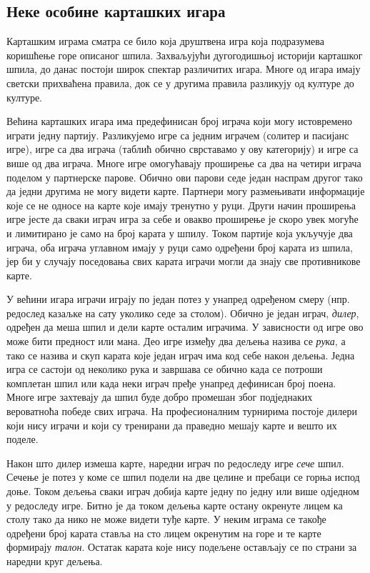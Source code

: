 \documentclass[a4paper, 12pt, ngerman]{article}
\let\oldsubsection\subsection
\renewcommand\subsection{\clearpage\oldsubsection}
\begin{document}
\subsection{Неке особине карташких игара}
Карташким играма сматра се било која друштвена игра која подразумева коришћење горе описаног шпила. Захваљујући дугогодишњој историји карташког шпила, до данас постоји широк спектар различитих игара. Многе од игара имају светски прихваћена правила, док се у другима правила разликују од културе до културе.

Већина карташких игара има предефинисан број играча који могу истовремено играти једну партију. Разликујемо игре са једним играчем (солитер и пасијанс игре), игре са два играча (таблић обично сврставамо у ову категорију) и игре са више од два играча. Многе игре омогућавају проширење са два на четири играча поделом у партнерске парове. Обично ови парови седе један наспрам другог тако да једни другима не могу видети карте. Партнери могу размењивати информације које се не односе на карте које имају тренутно у руци. Други начин проширења игре јесте да сваки играч игра за себе и овакво проширење је скоро увек могуће и лимитирано је само на број карата у шпилу. Током партије која укључује два играча, оба играча углавном имају у руци само одређени број карата из шпила, јер би у случају поседовања свих карата играчи могли да знају све противникове карте. 

У већини игара играчи играју по један потез у унапред одређеном смеру (нпр. редослед казаљке на сату уколико седе за столом). Обично је један играч, \textit{дилер}, одређен да меша шпил и дели карте осталим играчима. У зависности од игре ово може бити предност или мана. Део игре између два дељења назива се \textit{рука}, а тако се назива и скуп карата које један играч има код себе након дељења. Једна игра се састоји од неколико рука и завршава се обично када се потроши комплетан шпил или када неки играч пређе унапред дефинисан број поена. Многе игре захтевају да шпил буде добро промешан због подједнаких вероватноћа победе свих играча. На професионалним турнирима постоје дилери који нису играчи и који су тренирани да праведно мешају карте и вешто их поделе.

Након што дилер измеша карте, наредни играч по редоследу игре \textit{сече} шпил. Сечење је потез у коме се шпил подели на две целине и пребаци се горња испод доње. Током дељења сваки играч добија карте једну по једну или више одједном у редоследу игре. Битно је да током дељења карте остану окренуте лицем ка столу тако да нико не може видети туђе карте. У неким играма се такође одређени број карата ставља на сто лицем окренутим на горе и те карте формирају \textit{талон}. Остатак карата које нису подељене остављају се по страни за наредни круг дељења.
\end{document}
